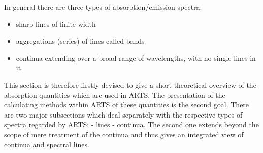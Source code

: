 %
\def\alphampmoc{\alpha^{\mbox{\rm \small MPM87}}_{\rm c}} 
\def\alphampmmc{\alpha^{\mbox{\rm \small MPM89}}_{\rm c}} 
\def\alphampmnc{\alpha^{\mbox{\rm \small MPM93}}_{\rm c}} 
\def\alphapwrc{\alpha^{\mbox{\rm \small R98}}_{\rm c}} 
\def\alphacpc{\alpha^{\mbox{\rm \small CP98}}_{\rm c}} 
%
\def\gamk{\gamma_{\mbox{\rm \small k}}}
\def\gamc{\gamma_{\mbox{\rm \small c}}}
%
\def\ws{w_{\mbox{\rm \small s,k}}}
\def\xs{x_{\mbox{\rm \small s,k}}}
\def\wf{w_{\mbox{\rm \small f,k}}}
\def\xf{x_{\mbox{\rm \small f,k}}}
%
\def\wn{\bar{\nu}}
\def\nucc{\nu_{\mbox{\rm \small c}}}
\def\nucut{\nu_{\mbox{\rm \small cutoff}}}
\def\nuo{\nu_{\mbox{\rm \small 0}}}
\def\nuk{\nu_{\mbox{\rm \small k}}}
%
\def\shape{F(\nu,\nuk)}
\def\shapec{F_{c}(\nu,\nuk)}
\def\shapefp{f_{c}(\nu,+\nuk)}
\def\shapefm{f_{c}(\nu,-\nuk)}
\def\shapefpm{f_{c}(\nu,\pm\nuk)}
\def\inten{S_{\mbox{\rm \small k}}(T)}
\def\inteno{S_{\mbox{\rm \small k}}(300\,K)}
\def\intencp{S_{\mbox{\rm \small 0}}(T)}
%
\def\cx{C_{\mbox{\rm \small x}}}
\def\cs{C_{\mbox{\rm \small H}_{2}\mbox{\rm \small O}}} 
\def\cf{C_{\mbox{\rm N}_{2}}} 
\def\cxo{C^{\mbox{\rm o}}_{\mbox{\rm \small X}}} 
\def\cso{C^{\mbox{\rm o}}_{\mbox{\rm \small H}_{2}\mbox{\rm \small O}}} 
\def\cfo{C^{\mbox{\rm o}}_{\mbox{\rm \small N}_{2}}} 
\def\cao{C^{\mbox{\rm o}}_{\mbox{\rm \small air}}}
\def\cdo{C^{\mbox{\rm o}}_{\mbox{\rm \small d}}}
\def\xx{{\rm n}_{\mbox{\rm \small  x}}} 
\def\xs{{\rm n}_{\mbox{\rm \small  s}}} 
\def\xf{{\rm n}_{\mbox{\rm \small  f}}} 
\def\xd{{\rm n}_{\mbox{\rm \small  d}}}
%


                                          

In general there are three types of absorption/emission spectra:
\begin{itemize}
\item sharp lines of finite width
\item aggregations (series) of lines called bands
\item continua extending over a broad range of wavelengths, with
      no single lines in it.
\end{itemize}
This section is therefore firstly devised to give a short theoretical
overview of the absorption quantities which are used in ARTS. The presentation
of the calculating methods within ARTS of these quantities is the
second goal.
There are two major subsections which deal separately with the respective types
of spectra regarded by ARTS: 
- lines 
- continua.
The second one extends beyond the scope of mere treatment of the
continua and thus gives an integrated view of continua and spectral lines.

